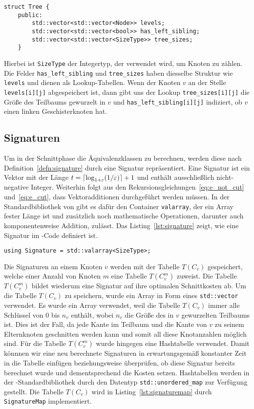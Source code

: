 \begin{lstlisting}[caption={Definition von \texttt{struct Tree}}, label={lst:structtree}]
struct Tree {
    public:
        std::vector<std::vector<Node>> levels;
        std::vector<std::vector<bool>> has_left_sibling;
        std::vector<std::vector<SizeType>> tree_sizes;
    }
\end{lstlisting}
Hierbei ist \texttt{SizeType} der Integertyp, der verwendet wird, um Knoten zu zählen.
Die Felder \texttt{has\_left\_sibling} und \texttt{tree\_sizes} haben diesselbe Struktur wie \texttt{levels} und dienen als Lookup-Tabellen.
Wenn der Knoten $v$ an der Stelle \texttt{levels[i][j]} abgespeichert ist, dann gibt uns der Lookup \texttt{tree\_sizes[i][j]} die Größe des Teilbaums gewurzelt in $v$ und \texttt{has\_left\_sibling[i][j]} indiziert, ob $v$ einen linken Geschisterknoten hat.

\subsection{Signaturen}\label{sec:sigimpl}
Um in der Schnittphase die Äquivalenzklassen zu berechnen, werden diese nach Definition~\ref{defn:signature} durch eine Signatur repräsentiert.
Eine Signatur ist ein Vektor mit der Länge $t = \lceil\log_{1+\varepsilon}(1/\varepsilon)\rceil + 1$ und enthält ausschließlich nicht-negative Integer.
Weiterhin folgt aus den Rekursionsgleichungen~\eqref{eq:e_not_cut} und~\eqref{eq:e_cut}, dass Vektoradditionen durchgeführt werden müssen.
In der Standardbibliothek von \Cpp{} gibt es dafür den Container \texttt{valarray}, der ein Array fester Länge ist und zusätzlich noch mathematische Operationen, darunter auch komponentenweise Addition, zulässt. 
Das Listing~\ref{lst:signature} zeigt, wie eine Signatur im \Cpp\hyp Code definiert ist.
\begin{lstlisting}[caption={Definition von \texttt{Signature}}, label={lst:signature}]
using Signature = std::valarray<SizeType>;
\end{lstlisting}

Die Signaturen an einem Knoten $v$ werden mit der Tabelle $T(C_v)$ gespeichert, welche einer Anzahl von Knoten $m$ eine Tabelle $T(C_v^m)$ zuweist.
Die Tabelle $T(C_v^m)$ bildet wiederum eine Signatur auf ihre optimalen Schnittkosten ab.
Um die Tabelle $T(C_v)$ zu speichern, wurde ein Array in Form eines \texttt{std::vector} verwendet.
Es wurde ein Array verwendet, weil die Tabelle $T(C_v)$ immer alle Schlüssel von $0$ bis $n_v$ enthält, wobei $n_v$ die Größe des in $v$ gewurzelten Teilbaums ist.
Dies ist der Fall, da jede Kante im Teilbaum und die Kante von $v$ zu seinem Elternknoten geschnitten werden kann und somit all diese Knotanzahlen möglich sind.
Für die Tabelle $T(C_v^m)$ wurde hingegen eine Hashtabelle verwendet.
Damit könnnen wir eine neu berechnete Signaturen in erwartungsgemäß konstanter Zeit in die Tabelle einfügen beziehungsweise überprüfen, ob diese Signatur bereits berechnet wurde und dementsprechend die Kosten setzen.
Hashtabellen werden in der \Cpp\hyp Standardbibliothek durch den Datentyp \texttt{std::unordered\_map} zur Verfügung gestellt.
Die Tabelle $T(C_v)$ wird in Listing~\ref{lst:signaturemap} durch \texttt{SignatureMap} implementiert.


